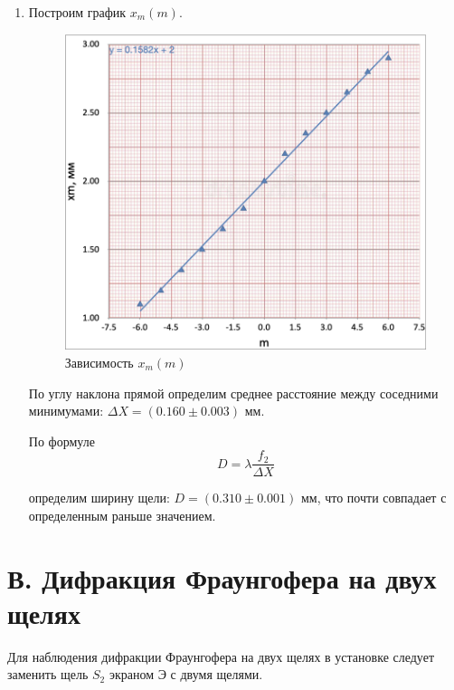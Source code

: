 \documentclass[12pt,a4paper]{article}
\begin{document}
\begin{enumerate}
		\item Построим график $x_m (m)$.
		\begin{figure}[h!]
			\centering
			\includegraphics[scale=0.62]{src/X(m)}
			\caption{Зависимость $x_m(m)$}
		\end{figure}
		
		По углу наклона прямой определим среднее расстояние между соседними минимумами: $\Delta X = (0.160 \pm 0.003)$ мм. 
		
		По формуле 
		\begin{equation*}
			D = \lambda \frac{f_2}{\Delta X}
		\end{equation*}
	
		определим ширину щели: $D = (0.310 \pm 0.001)$ мм, что почти совпадает с определенным раньше значением.
	\end{enumerate}


	\section*{В. Дифракция Фраунгофера на двух щелях}
	
	Для наблюдения дифракции Фраунгофера на двух щелях в установке следует заменить щель $S_2$ экраном Э с двумя щелями. 
	
\end{document}
